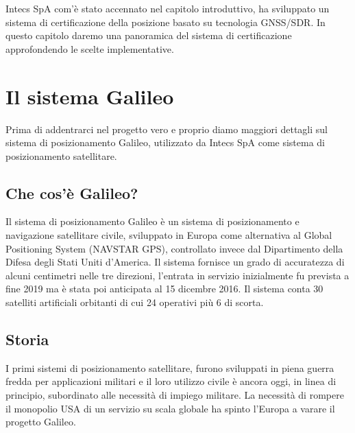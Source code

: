 Intecs SpA com'è stato accennato nel capitolo introduttivo, ha sviluppato un sistema di certificazione della posizione basato su tecnologia GNSS/SDR. In questo capitolo daremo una panoramica del sistema di certificazione approfondendo le scelte implementative.

\section{Il sistema Galileo}
Prima di addentrarci nel progetto vero e proprio diamo maggiori dettagli sul sistema di posizionamento Galileo, utilizzato da Intecs SpA come sistema di posizionamento satellitare.

\subsection{Che cos'è Galileo?}
Il sistema di posizionamento Galileo è un sistema di posizionamento e navigazione satellitare civile, sviluppato in Europa come alternativa al Global Positioning System (NAVSTAR GPS), controllato invece dal Dipartimento della Difesa degli Stati Uniti d'America. Il sistema fornisce un grado di accuratezza di alcuni centimetri nelle tre direzioni, l'entrata in servizio inizialmente fu prevista a fine 2019 ma è stata poi anticipata al 15 dicembre 2016. Il sistema conta 30 satelliti artificiali orbitanti di cui 24 operativi più 6 di scorta.

\subsection{Storia}
I primi sistemi di posizionamento satellitare, furono sviluppati in piena guerra fredda per applicazioni militari e il loro utilizzo civile è ancora oggi, in linea di principio, subordinato alle necessità di impiego militare. La necessità di rompere il monopolio USA di un servizio su scala globale ha spinto l'Europa a varare il progetto Galileo.

